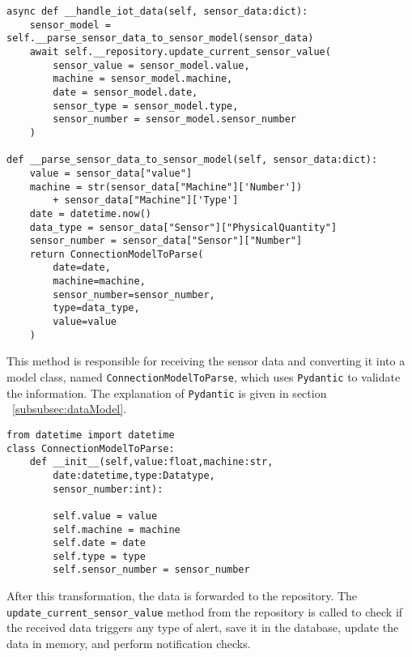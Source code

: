 \begin{verbatim}
async def __handle_iot_data(self, sensor_data:dict):
    sensor_model = self.__parse_sensor_data_to_sensor_model(sensor_data)
    await self.__repository.update_current_sensor_value(
        sensor_value = sensor_model.value,
        machine = sensor_model.machine,
        date = sensor_model.date,
        sensor_type = sensor_model.type,
        sensor_number = sensor_model.sensor_number
    )

def __parse_sensor_data_to_sensor_model(self, sensor_data:dict):
    value = sensor_data["value"]
    machine = str(sensor_data["Machine"]['Number']) 
        + sensor_data["Machine"]['Type']
    date = datetime.now()
    data_type = sensor_data["Sensor"]["PhysicalQuantity"]
    sensor_number = sensor_data["Sensor"]["Number"]
    return ConnectionModelToParse(
        date=date,
        machine=machine,
        sensor_number=sensor_number,
        type=data_type,
        value=value
    )
\end{verbatim}

This method is responsible for receiving the sensor data and converting it into a model class, named \texttt{ConnectionModelToParse}, which uses \texttt{Pydantic} to validate the information. The explanation of \texttt{Pydantic} is given in section ~\ref{subsubsec:dataModel}.

\begin{verbatim}
from datetime import datetime
class ConnectionModelToParse:
    def __init__(self,value:float,machine:str,
        date:datetime,type:Datatype,
        sensor_number:int):

        self.value = value
        self.machine = machine
        self.date = date
        self.type = type
        self.sensor_number = sensor_number
\end{verbatim}

After this transformation, the data is forwarded to the repository. The \texttt{update\_current\_sensor\_value} method from the repository is called to check if the received data triggers any type of alert, save it in the database, update the data in memory, and perform notification checks.


